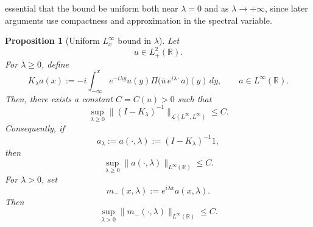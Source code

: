 \documentclass[10pt]{article}
\newtheorem{proposition}[theorem]{Proposition}
\numberwithin{equation}{section}
\numberwithin{theorem}{section}
\begin{document}
essential that the bound be uniform both near \(\lambda=0\) and as
\(\lambda\to+\infty\), since later arguments use compactness and approximation in the
spectral variable.
\begin{proposition}[Uniform \(L^\infty_x\) bound in \(\lambda\)]
\label{prop:uniform_m}
Let
\[
u\in L^2_+(\mathbb R).
\]
For \(\lambda\ge0\), define
\[
K_\lambda a(x)
:=
-i\int_{-\infty}^x
e^{-i\lambda y}u(y)
\Pi\bigl(\overline u\,e^{i\lambda\cdot}a\bigr)(y)\,dy ,
\qquad a\in L^\infty(\mathbb R).
\]
Then, there exists a constant \(C=C(u)>0\) such that
\begin{equation}
\label{2.3}
\sup_{\lambda\ge0}
\|(I-K_\lambda)^{-1}\|_{\mathcal L(L^\infty,L^\infty)}
\le C .
\end{equation}
Consequently, if
\[
a_\lambda:=a(\cdot,\lambda):=(I-K_\lambda)^{-1}1,
\]
then
\[
\sup_{\lambda\ge0}\|a(\cdot,\lambda)\|_{L^\infty(\mathbb R)}\le C.
\]
For \(\lambda>0\), set
\[
m_-(x,\lambda):=e^{i\lambda x}a(x,\lambda).
\]
Then
\[
\sup_{\lambda>0}\|m_-(\cdot,\lambda)\|_{L^\infty(\mathbb R)}\le C.
\]
\end{proposition}
\end{document}
